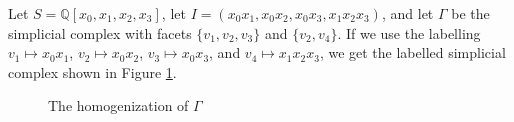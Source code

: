 \documentclass[12pt,leqno]{amsart}
\theoremstyle{definition}
\newenvironment{example}
{\pushQED{\qed}\renewcommand{\qedsymbol}{$\diamond$}\examplex}
{\popQED\endexamplex}
\begin{document}
\begin{example}\label{Example: First example of a homogenized chain complex}
    Let $S = \mathbb Q[x_0,x_1,x_2,x_3]$, let $I = (x_0x_1,x_0x_2,x_0x_3,x_1x_2x_3)$, and let $\Gamma$ be the simplicial complex with facets $\{ v_1,v_2,v_3 \}$ and $\{ v_2, v_4 \}$.
  If we use the labelling $v_1 \longmapsto x_0x_1$, $v_2 \longmapsto x_0x_2$, $v_3 \longmapsto x_0x_3$, and $v_4 \longmapsto x_1x_2x_3$, we get the labelled simplicial complex shown in Figure \ref{Figure: Example of a labelled simplicial complex}.
  \begin{figure}[h]\centering
  \caption{The homogenization of $\Gamma$}\label{Figure: Example of a labelled simplicial complex}

\end{figure}
\end{example}
\end{document}
